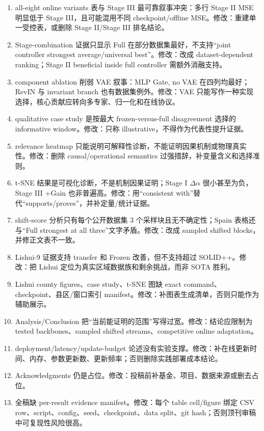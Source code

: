 ﻿\documentclass[journal]{IEEEtran}
\newcommand{\auditid}[1]{\textcolor{auditred}{\textbf{[#1]}}}
\begin{document}
\begin{enumerate}
\item[\auditid{P24}] all-eight online variants 表与 Stage III 最可靠叙事冲突：多行 Stage II MSE 明显低于 Stage III，且可能混用不同 checkpoint/offline MSE。修改：重建单一受控表，或删除 Stage II/Stage III 排名结论。
\item[\auditid{P25}] Stage-combination 证据只显示 Full 在部分数据集最好，不支持“joint controller strongest average/universal best”。修改：改成 dataset-dependent ranking；Stage II beneficial inside full controller 需额外消融支持。
\item[\auditid{P26}] component ablation 削弱 VAE 叙事：MLP Gate, no VAE 在四列均最好；RevIN 与 invariant branch 也有数据集例外。修改：VAE 只能写作一种实现选择，核心贡献应转向多专家、归一化和在线协议。
\item[\auditid{P27}] qualitative case study 是按最大 frozen-versus-full disagreement 选择的 informative window。修改：只称 illustrative，不得作为代表性提升证据。
\item[\auditid{P28}] relevance heatmap 只能说明可解释性诊断，不能证明因果机制或物理真实性。修改：删除 causal/operational semantics 过强措辞，补变量含义和选择准则。
\item[\auditid{P29}] t-SNE 结果是可视化诊断，不是机制因果证明；Stage I \(\Delta\alpha\) 很小甚至为负，Stage III +Gain 也非普遍高。修改：用“consistent with”替代“supports/proves”，并补定量/统计证据。
\item[\auditid{P30}] shift-score 分析只有每个公开数据集 3 个采样块且无不确定性；Spain 表格还与“Full strongest at all three”文字矛盾。修改：改成 sampled shifted blocks，并修正文表不一致。
\item[\auditid{P31}] Lishui-9 证据支持 transfer 和 Frozen 改善，但不支持超过 SOLID++。修改：把 Lishui 定位为真实区域数据族和剩余挑战，而非 SOTA 胜利。
\item[\auditid{P32}] Lishui county figures、case study、t-SNE 图缺 exact command、checkpoint、县区/窗口索引 manifest。修改：补图表生成清单，否则只能作为辅助展示。
\item[\auditid{P33}] Analysis/Conclusion 把“当前能证明的范围”写得过宽。修改：结论应限制为 tested backbones、sampled shifted streams、competitive online adaptation。
\item[\auditid{P34}] deployment/latency/update-budget 论述没有实验支撑。修改：补在线更新时间、内存、参数更新数、更新频率；否则删除实践部署成本结论。
\item[\auditid{P35}] Acknowledgments 仍是占位。修改：投稿前补基金、项目、数据来源或删去占位。
\item[\auditid{P36}] 全稿缺 per-result evidence manifest。修改：每个 table cell/figure 绑定 CSV row、script、config、seed、checkpoint、data split、git hash；否则顶刊审稿中可复现性风险很高。
\end{enumerate}
\normalsize
\end{document}
